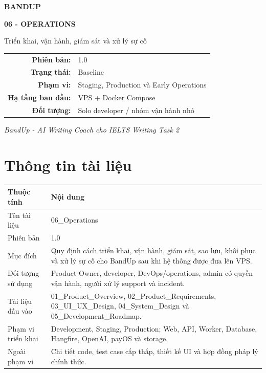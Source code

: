 \documentclass[11pt,a4paper]{article}
\renewcommand{\arraystretch}{1.22}
\begin{document}
\begin{titlepage}
\centering
\vspace*{2.3cm}
{\sffamily\fontsize{34}{40}\selectfont\bfseries\color{BandBlue} BANDUP\par}
\vspace{0.55cm}
{\sffamily\fontsize{22}{28}\selectfont\bfseries 06 - OPERATIONS\par}
\vspace{0.25cm}
{\sffamily\large Triển khai, vận hành, giám sát và xử lý sự cố\par}
\vfill
\begin{center}
\renewcommand{\arraystretch}{1.3}
\begin{tabular}{>{\sffamily\bfseries}r l}
Phiên bản: & 1.0 \\
Trạng thái: & Baseline \\
Phạm vi: & Staging, Production và Early Operations \\
Hạ tầng ban đầu: & VPS + Docker Compose \\
Đối tượng: & Solo developer / nhóm vận hành nhỏ
\end{tabular}
\end{center}
\vspace{1.2cm}
{\sffamily\itshape BandUp - AI Writing Coach cho IELTS Writing Task 2\par}
\vspace*{1.1cm}
\end{titlepage}

\section*{Thông tin tài liệu}
\begin{longtable}{L{0.28\textwidth}L{0.66\textwidth}}
\toprule
\textbf{Thuộc tính} & \textbf{Nội dung} \\
\midrule
Tên tài liệu & 06\_Operations \\
Phiên bản & 1.0 \\
Mục đích & Quy định cách triển khai, vận hành, giám sát, sao lưu, khôi phục và xử lý sự cố cho BandUp sau khi hệ thống được đưa lên VPS. \\
Đối tượng sử dụng & Product Owner, developer, DevOps/operations, admin có quyền vận hành, người xử lý support và incident. \\
Tài liệu đầu vào & 01\_Product\_Overview, 02\_Product\_Requirements, 03\_UI\_UX\_Design, 04\_System\_Design và 05\_Development\_Roadmap. \\
Phạm vi triển khai & Development, Staging, Production; Web, API, Worker, Database, Hangfire, OpenAI, payOS và storage. \\
Ngoài phạm vi & Chi tiết code, test case cấp thấp, thiết kế UI và hợp đồng pháp lý chính thức. \\
\bottomrule
\end{longtable}
\end{document}
